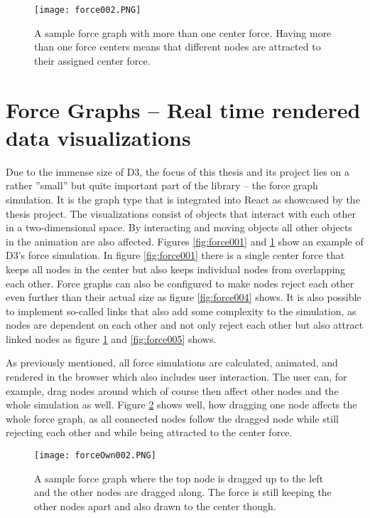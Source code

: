 \begin{figure}
  \centering
  \texttt{[image: force002.PNG]}
  \caption{A sample force graph with more than one center force. Having more than one force centers means that different nodes are attracted to their assigned center force.}
  \label{fig:force002}
\end{figure}

\section{Force Graphs -- Real time rendered data visualizations}

Due to the immense size of D3, the focus of this thesis and its project lies on a rather ''small'' but quite important part of the library -- the force graph simulation. It is the graph type that is integrated into React as showcased by the thesis project. The visualizations consist of objects that interact with each other in a two-dimensional space. By interacting and moving objects all other objects in the animation are also affected. Figures \ref{fig:force001} and \ref{fig:force002} show an example of D3's force simulation. In figure \ref{fig:force001} there is a single center force that keeps all nodes in the center but also keeps individual nodes from overlapping each other. Force graphs can also be configured to make nodes reject each other even further than their actual size as figure \ref{fig:force004} shows. It is also possible to implement so-called links that also add some complexity to the simulation, as nodes are dependent on each other and not only reject each other but also attract linked nodes as figure \ref{fig:force002} and \ref{fig:force005} shows.

As previously mentioned, all force simulations are calculated, animated, and rendered in the browser which also includes user interaction. The user can, for example, drag nodes around which of course then affect other nodes and the whole simulation as well. Figure \ref{fig:force003} shows well, how dragging one node affects the whole force graph, as all connected nodes follow the dragged node while still rejecting each other and while being attracted to the center force.

\begin{figure}
  \centering
  \texttt{[image: forceOwn002.PNG]}
  \caption{A sample force graph where the top node is dragged up to the left and the other nodes are dragged along. The force is still keeping the other nodes apart and also drawn to the center though.}
  \label{fig:force003}
\end{figure}


